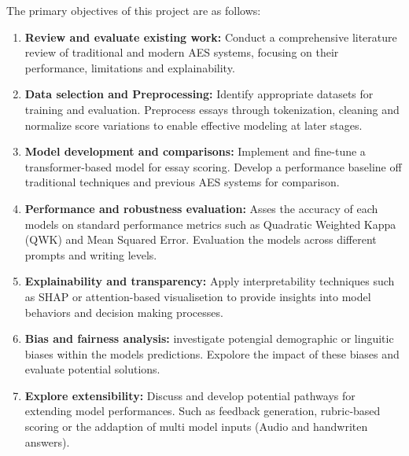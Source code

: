 \documentclass[8pt]{report}
\begin{document}
The primary objectives of this project are as follows:
\begin{enumerate}
    \item \textbf{Review and evaluate existing work: } Conduct a comprehensive literature review of traditional and modern AES systems, focusing on their performance, limitations and explainability.
    \item \textbf{Data selection and Preprocessing: } Identify appropriate datasets for training and evaluation. Preprocess essays through tokenization, cleaning and normalize score variations to enable 
    effective modeling at later stages.
    \item \textbf{Model development and comparisons: } Implement and fine-tune a transformer-based model for essay scoring. Develop a performance baseline off traditional techniques and previous AES 
    systems for comparison.
    \item \textbf{Performance and robustness evaluation: } Asses the accuracy of each models on standard performance metrics such as Quadratic Weighted Kappa (QWK) and Mean Squared Error. Evaluation the models across 
    different prompts and writing levels.
    \item \textbf{Explainability and transparency: } Apply interpretability techniques such as SHAP or attention-based visualisetion to provide insights into model behaviors and decision making processes.
    \item \textbf{Bias and fairness analysis: } investigate potengial demographic or linguitic biases within the models predictions. Expolore the impact of these biases and evaluate potential solutions.
    \item \textbf{ Explore extensibility: } Discuss and develop potential pathways for extending model performances. Such as feedback generation, rubric-based scoring or the addaption of multi model inputs (Audio and handwriten answers).
\end{enumerate}
\end{document}
